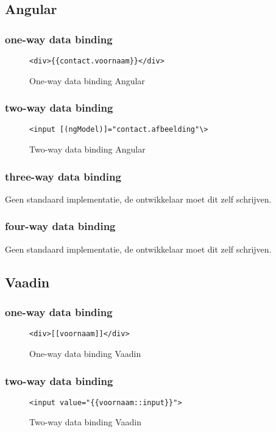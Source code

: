 \subsection{Angular}

\subsubsection{one-way data binding}
\begin{figure}[H]
\begin{lstlisting}
<div>{{contact.voornaam}}</div>
\end{lstlisting}
\caption{One-way data binding Angular}
\end{figure}
\subsubsection{two-way data binding}

\begin{figure}[H]
\begin{lstlisting}
<input [(ngModel)]="contact.afbeelding"\>
\end{lstlisting}
\caption{Two-way data binding Angular}
\end{figure}
\subsubsection{three-way data binding}
Geen standaard implementatie, de ontwikkelaar moet dit zelf schrijven.

\subsubsection{four-way data binding}
Geen standaard implementatie, de ontwikkelaar moet dit zelf schrijven.
\subsection{Vaadin}
\subsubsection{one-way data binding}

\begin{figure}[H]
\begin{lstlisting}
<div>[[voornaam]]</div>
\end{lstlisting}
\caption{One-way data binding Vaadin}
\end{figure}
\subsubsection{two-way data binding}
\begin{figure}[H]
\begin{lstlisting}
<input value="{{voornaam::input}}">
\end{lstlisting}
\caption{Two-way data binding Vaadin}
\end{figure}

